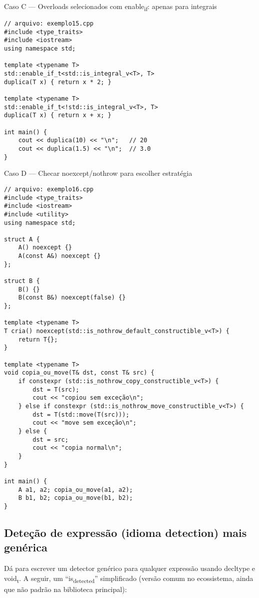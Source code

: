 \documentclass[11pt]{article}
\begin{document}
Caso C — Overloads selecionados com enable\textsubscript{if}: apenas para integrais
\begin{verbatim}
// arquivo: exemplo15.cpp
#include <type_traits>
#include <iostream>
using namespace std;

template <typename T>
std::enable_if_t<std::is_integral_v<T>, T>
duplica(T x) { return x * 2; }

template <typename T>
std::enable_if_t<!std::is_integral_v<T>, T>
duplica(T x) { return x + x; }

int main() {
    cout << duplica(10) << "\n";   // 20
    cout << duplica(1.5) << "\n";  // 3.0
}
\end{verbatim}

Caso D — Checar noexcept/nothrow para escolher estratégia
\begin{verbatim}
// arquivo: exemplo16.cpp
#include <type_traits>
#include <iostream>
#include <utility>
using namespace std;

struct A {
    A() noexcept {}
    A(const A&) noexcept {}
};

struct B {
    B() {}
    B(const B&) noexcept(false) {}
};

template <typename T>
T cria() noexcept(std::is_nothrow_default_constructible_v<T>) {
    return T{};
}

template <typename T>
void copia_ou_move(T& dst, const T& src) {
    if constexpr (std::is_nothrow_copy_constructible_v<T>) {
        dst = T(src);
        cout << "copiou sem exceção\n";
    } else if constexpr (std::is_nothrow_move_constructible_v<T>) {
        dst = T(std::move(T(src)));
        cout << "move sem exceção\n";
    } else {
        dst = src;
        cout << "copia normal\n";
    }
}

int main() {
    A a1, a2; copia_ou_move(a1, a2);
    B b1, b2; copia_ou_move(b1, b2);
}
\end{verbatim}
\subsection{Deteção de expressão (idioma detection) mais genérica}
\label{sec:org7264daa}

Dá para escrever um detector genérico para qualquer expressão usando decltype e void\textsubscript{t}. A seguir, um “is\textsubscript{detected}” simplificado (versão comum no ecossistema, ainda que não padrão na biblioteca principal):
\end{document}

